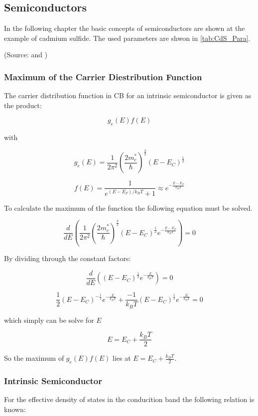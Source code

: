 \subsection{Semiconductors} \label{chap3}

In the following chapter the basic concepts of semiconductors are shown
at the example of cadmium sulfide. The used parameters are shwon in 
\autoref{tab:CdS_Para}.

(Source: \cite[Elementary Solid State Physics Chapter 6]{elementary_SSP} and
\cite[Molecular and Solid State Physics Script, TU Graz]{LAMPTU})

\subsubsection*{Maximum of the Carrier Diestribution Function}
The carrier distribution function in CB for an intrinsic semiconductor
is given as the product:

$$g_e(E) f(E)$$

with

$$g_e(E) = \frac{1}{2\pi^2} \left( \frac{2m_e^*}{\hbar} \right)^\frac{3}{2} (E-E_C)^\frac{1}{2}$$

$$f(E) = \frac{1}{e^{(E-E_F)/k_BT}+1}  \approx e^{-\frac{E-E_F}{k_BT}}$$

To calculate the maximum of the function the following equation must be solved.

$$\frac{d}{dE} \left(\frac{1}{2\pi^2} \left( \frac{2m_e^*}{\hbar} \right)^\frac{3}{2} (E-E_C)^\frac{1}{2} e^{-\frac{E-E_F}{k_BT}} \right) = 0$$

By dividing through the constant factors:

$$\frac{d}{dE} \left( (E-E_C)^\frac{1}{2} e^{-\frac{E}{k_BT}} \right) = 0$$

$$\frac{1}{2} (E-E_C)^{-\frac{1}{2}} e^{-\frac{E}{k_BT}} + \frac{-1}{k_BT} (E-E_C)^\frac{1}{2} e^{-\frac{E}{k_BT}} = 0$$

which simply can be solve for $E$

$$E = E_C + \frac{k_BT}{2}$$

So the maximum of $g_e(E) f(E)$ lies at $E = E_C + \frac{k_BT}{2}$.

\subsubsection*{Intrinsic Semiconductor}

For the effective density of states in the conducition band 
the following relation is known:


